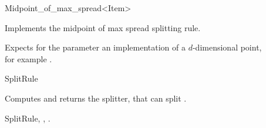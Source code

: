 

\begin{ccRefFunctionObjectClass}{Midpoint_of_max_spread<Item>}  %


\begin{ccAdvanced}

\ccDefinition
Implements the midpoint of max spread splitting rule.


\ccParameters

Expects for the parameter  an implementation of 
a $d$-dimensional point, \\
for example .



\ccIsModel

SplitRule

\ccTypes


\ccCreation
{}  %



{Computes and returns the splitter, that can split .}

\ccSeeAlso

SplitRule,
,
.

\end{ccAdvanced}

\end{ccRefFunctionObjectClass}



